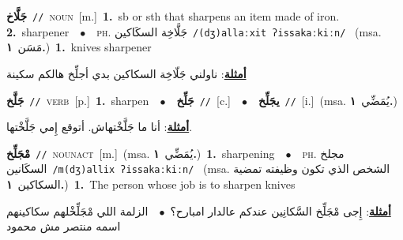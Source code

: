 \documentclass[10pt,a4paper,twoside]{article} %
\begin{document}
\begin{multicols}{2}
{\setlength\topsep{0pt}\textbf{\foreignlanguage{arabic}{جَلَّاخ}}\ {\color{gray}\texttt{//}\color{black}}\ \textsc{noun}\ [m.]\ \textbf{1.}~sb or sth that sharpens an item made of iron.  \textbf{2.}~sharpener\ \ $\bullet$\ \ \textsc{ph.} \color{gray} \foreignlanguage{arabic}{جَلَّاخِة السكَاكين}\color{black}\ {\color{gray}\texttt{/{\sffamily (dʒ)allaːxit ʔissakaːkiːn}/}\color{black}}\ \color{gray} (msa. \foreignlanguage{arabic}{مَسَن}~\foreignlanguage{arabic}{\textbf{١.}})\color{black}\ \textbf{1.}~knives sharpener\  \begin{flushright}\color{gray}\foreignlanguage{arabic}{\textbf{\underline{\foreignlanguage{arabic}{أمثلة}}}: ناولني جَلّاخِة السكاكين بدي أجلِّخ هالكم سكينة}\end{flushright}\color{black}} \vspace{2mm}

{\setlength\topsep{0pt}\textbf{\foreignlanguage{arabic}{جَلَّخ}}\ {\color{gray}\texttt{//}\color{black}}\ \textsc{verb}\ [p.]\ \textbf{1.}~sharpen\ \ $\bullet$\ \ \setlength\topsep{0pt}\textbf{\foreignlanguage{arabic}{جَلِّخ}}\ {\color{gray}\texttt{//}\color{black}}\ [c.]\ \ $\bullet$\ \ \setlength\topsep{0pt}\textbf{\foreignlanguage{arabic}{يجَلِّخ}}\ {\color{gray}\texttt{//}\color{black}}\ [i.]\ \color{gray}(msa. \foreignlanguage{arabic}{يُمَضِّي}~\foreignlanguage{arabic}{\textbf{١.}})\color{black}\  \begin{flushright}\color{gray}\foreignlanguage{arabic}{\textbf{\underline{\foreignlanguage{arabic}{أمثلة}}}: أنا ما جَلَّخْتهاش. أتوقع إِمي جَلَّخْتها.}\end{flushright}\color{black}} \vspace{2mm}

{\setlength\topsep{0pt}\textbf{\foreignlanguage{arabic}{مْجَلِّخ}}\ {\color{gray}\texttt{//}\color{black}}\ \textsc{noun\textunderscore act}\ [m.]\ \color{gray}(msa. \foreignlanguage{arabic}{يُمَضِّي}~\foreignlanguage{arabic}{\textbf{١.}})\color{black}\ \textbf{1.}~sharpening\ \ $\bullet$\ \ \textsc{ph.} \color{gray} \foreignlanguage{arabic}{مجلخ السكَانين}\color{black}\ {\color{gray}\texttt{/{\sffamily m(dʒ)allix ʔissakaːkiːn}/}\color{black}}\ \color{gray} (msa. \foreignlanguage{arabic}{الشخص الذي تكون وظيفته تمضية السكاكين}~\foreignlanguage{arabic}{\textbf{١.}})\color{black}\ \textbf{1.}~The person whose job is to sharpen knives\  \begin{flushright}\color{gray}\foreignlanguage{arabic}{\textbf{\underline{\foreignlanguage{arabic}{أمثلة}}}: إِجى مْجَلِّخ السَّكانِين عندكم عالدار امبارح؟\ $\bullet$\ \  الزلمة اللي مْجَلِّخْلهم سكاكينهم اسمه منتصر مش محمود}\end{flushright}\color{black}} \vspace{2mm}


\end{multicols}
\end{document}
